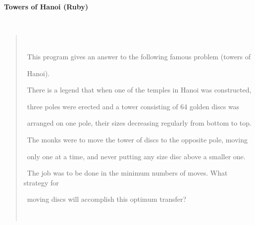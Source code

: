 \documentclass[a4paper,10pt]{article}
\def\mc{\relax}
\begin{document}
\tt\mc 

\noindent
\mbox{}\rm\mc {\tt\#} \hrulefill 
\tt\mc 

\noindent
\mbox{}\rm\mc {\tt\#}
\tt\mc 

\noindent
\mbox{}\rm\mc {\tt\#} \ %
\tt\mc 

\noindent
\mbox{}\rm\mc {\tt\#}
\tt\mc 

\noindent
\mbox{}\rm\mc {\tt\#} \ \centerline{\bf Towers of Hanoi (Ruby)} 
\tt\mc 

\noindent
\mbox{}\rm\mc {\tt\#}
\tt\mc 

\noindent
\mbox{}\rm\mc {\tt\#} \ \begin{quote} 
\tt\mc 

\noindent
\mbox{}\rm\mc {\tt\#} \ \noindent 
\tt\mc 

\noindent
\mbox{}\rm\mc {\tt\#} \ This program gives an answer to the following famous problem (towers of 
\tt\mc 

\noindent
\mbox{}\rm\mc {\tt\#} \ Hanoi). 
\tt\mc 

\noindent
\mbox{}\rm\mc {\tt\#} \ There is a legend that when one of the temples in Hanoi was constructed, 
\tt\mc 

\noindent
\mbox{}\rm\mc {\tt\#} \ three poles were erected and a tower consisting of 64 golden discs was 
\tt\mc 

\noindent
\mbox{}\rm\mc {\tt\#} \ arranged on one pole, their sizes decreasing regularly from bottom to top. 
\tt\mc 

\noindent
\mbox{}\rm\mc {\tt\#} \ The monks were to move the tower of discs to the opposite pole, moving 
\tt\mc 

\noindent
\mbox{}\rm\mc {\tt\#} \ only one at a time, and never putting any size disc above a smaller one. 
\tt\mc 

\noindent
\mbox{}\rm\mc {\tt\#} \ The job was to be done in the minimum numbers of moves. What strategy for 
\tt\mc 

\noindent
\mbox{}\rm\mc {\tt\#} \ moving discs will accomplish this optimum transfer? 
\tt\mc 

\noindent
\mbox{}\rm\mc {\tt\#} \ \end{quote} 
\tt\mc 

\noindent
\mbox{}\rm\mc {\tt\#}
\tt\mc 

\noindent
\mbox{}\rm\mc {\tt\#} \ %
\tt\mc 

\noindent
\mbox{}\rm\mc {\tt\#}
\tt\mc 

\noindent
\mbox{}\rm\mc {\tt\#} \hrulefill 
\tt\mc 
\end{document}
